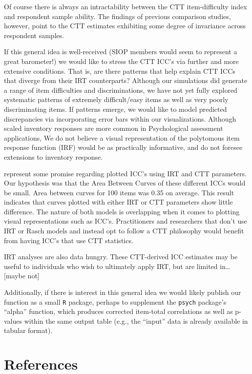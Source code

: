 \documentclass[
  jou]{apa6}
\begin{document}
Of course there is always an intractability between the CTT item-difficulty index and respondent sample ability. The findings of previous comparison studies, however, point to the CTT estimates exhibiting some degree of invariance across respondent samples.

If this general idea is well-received (SIOP members would seem to represent a great barometer!) we would like to stress the CTT ICC's via further and more extensive conditions. That is, are there patterns that help explain CTT ICCs that diverge from their IRT counterparts? Although our simulations did generate a range of item difficulties and discriminations, we have not yet fully explored systematic patterns of extremely difficult/easy items as well as very poorly discriminating items. If patterns emerge, we would like to model predicted discrepancies via incorporating error bars within our visualizations. Although scaled inventory responses are more common in Psychological assessment applications, We do not believe a visual representation of the polytomous item response function (IRF) would be as practically informative, and do not foresee extensions to inventory response.

represent some promise regarding plotted ICC's using IRT and CTT parameters. Our hypothesis was that the Area Between Curves of these different ICCs would be small. Area between curves for 100 items was 0.35 on average. This result indicates that curves plotted with either IRT or CTT parameters show little difference. The nature of both models is overlapping when it comes to plotting visual representations such as ICC's. Practitioners and researchers that don't use IRT or Rasch models and instead opt to follow a CTT philosophy would benefit from having ICC's that use CTT statistics.

IRT analyses are also data hungry. These CTT-derived ICC estimates may be useful to individuals who wish to ultimately apply IRT, but are limited in\ldots{} {[}maybe not{]}

Additionally, if there is interest in this general idea we would likely publish our function as a small \texttt{R} package, perhaps to supplement the \texttt{psych} package's ``alpha'' function, which produces corrected item-total correlations as well as p-values within the same output table (e.g., the ``input'' data is already available in tabular format).

\newpage

\hypertarget{references}{%
\section{References}\label{references}}
\end{document}
